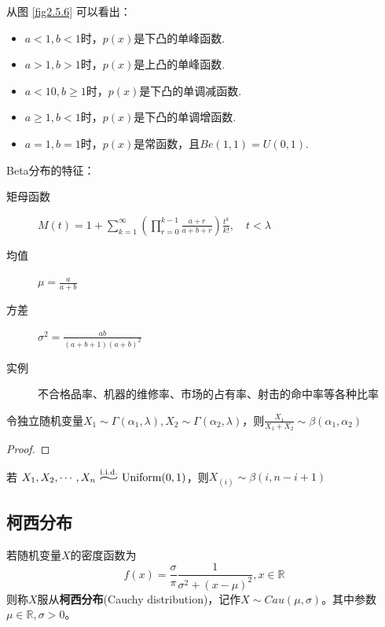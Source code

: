 从图 \ref{fig2.5.6} 可以看出：
\begin{itemize}
    \item $a<1,b<1$时，$p(x)$是下凸的单峰函数.
    \item $a>1,b>1$时，$p(x)$是上凸的单峰函数.
    \item $a<10,b\ge1$时，$p(x)$是下凸的单调减函数.
    \item $a\ge1,b<1$时，$p(x)$是下凸的单调增函数.
    \item $a=1,b=1$时，$p(x)$是常函数，且\underline{$Be(1,1)=U(0,1)$}.
\end{itemize}

Beta分布的特征：
\begin{description}
    \item[矩母函数] $M(t)=1+\sum_{k=1}^{\infty}(\prod_{r=0}^{k-1} \frac{a+r}{a+b+r})\frac{t^k}{k!}, \quad t<\lambda$
    \item[均值] $\mu=\frac{a}{a+b}$
    \item[方差] $\sigma^2=\frac{ab}{(a+b+1)(a+b)^{2}}$
    \item[实例] 不合格品率、机器的维修率、市场的占有率、射击的命中率等各种比率
\end{description}

\begin{proposition}
    令独立随机变量$X_1 \sim \Gamma(\alpha_1,\lambda),X_2 \sim  \Gamma(\alpha_2,\lambda)$，则$\frac{X_1}{X_1+X_2} \sim \beta(\alpha_1,\alpha_2)$
\end{proposition}
\begin{proof}
\end{proof}

\begin{proposition}
    若 $X_1,X_2,\cdots,X_n \iidsim \Uniform(0,1)$，则$X_{(i)} \sim \beta(i,n-i+1) $
\end{proposition}

\subsection{柯西分布}

\begin{definition}
    若随机变量$X$的密度函数为
    \[ f(x) = \frac{\sigma}{\pi} \frac1{\sigma^2+(x-\mu)^2} ,x \in \mathbb{R} \]
    则称$X$服从\textbf{柯西分布}(Cauchy distribution)，记作$X\sim Cau(\mu,\sigma)$。其中参数$\mu \in \mathbb{R},\sigma>0$。
\end{definition}

